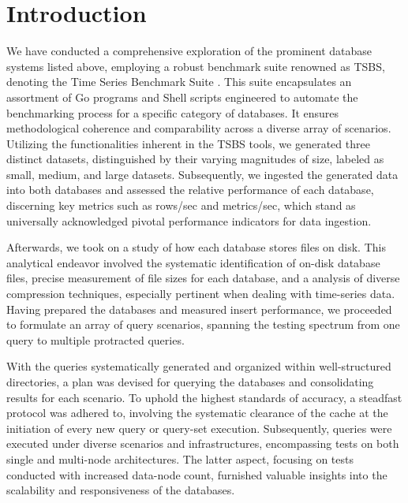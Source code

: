 \documentclass[conference]{IEEEtran}
\begin{document}

\section{Introduction}
We have conducted a comprehensive exploration of the prominent database systems listed above, employing a robust benchmark suite renowned as TSBS, denoting the Time Series Benchmark Suite \cite{b1}. This suite encapsulates an assortment of Go programs and Shell scripts engineered to automate the benchmarking process for a specific category of databases. It ensures methodological coherence and comparability across a diverse array of scenarios. Utilizing the functionalities inherent in the TSBS tools, we generated three distinct datasets, distinguished by their varying magnitudes of size, labeled as small, medium, and large datasets. Subsequently, we ingested the generated data into both databases and assessed the relative performance of each database, discerning key metrics such as rows/sec and metrics/sec, which stand as universally acknowledged pivotal performance indicators for data ingestion. 

Afterwards, we took on a study of how each database stores files on disk. This analytical endeavor involved the systematic identification of on-disk database files, precise measurement of file sizes for each database, and a analysis of diverse compression techniques, especially pertinent when dealing with time-series data. Having prepared the databases and measured insert performance, we proceeded to formulate an array of query scenarios, spanning the testing spectrum from one query to multiple protracted queries.

With the queries systematically generated and organized within well-structured directories, a plan was devised for querying the databases and consolidating results for each scenario. To uphold the highest standards of accuracy, a steadfast protocol was adhered to, involving the systematic clearance of the cache at the initiation of every new query or query-set execution. Subsequently, queries were executed under diverse scenarios and infrastructures, encompassing tests on both single and multi-node architectures. The latter aspect, focusing on tests conducted with increased data-node count, furnished valuable insights into the scalability and responsiveness of the databases. 
\end{document}
